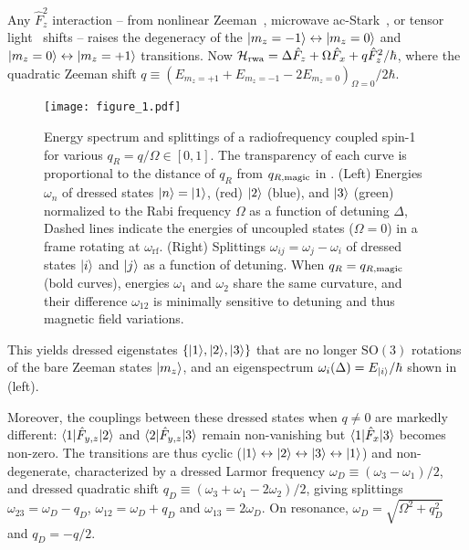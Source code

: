 \documentclass[aps,prl,reprint,superscriptaddress,floatfix]{revtex4-1}
\begin{document}
Any $\hat{F}_z^2$ interaction -- from nonlinear Zeeman~\cite{ramsey_molecular_1956}, microwave ac-Stark~\cite{gerbier_resonant_2006}, or tensor light~\cite{smith_continuous_2004} shifts -- raises the degeneracy of the $\vert m_z=-1 \rangle  \leftrightarrow \vert m_z=0 \rangle $ and $\vert m_z=0 \rangle  \leftrightarrow \vert m_z=+1 \rangle $ transitions. 
Now $\mathcal{H}_{\text{rwa}} = \Delta \hat{F}_z + \Omega \hat{F}_x + q \hat{F}_z^2/\hbar$, where the quadratic Zeeman shift $q \equiv (E_{m_z=+1} + E_{m_z=-1} - 2 E_{m_z=0})_{\Omega=0}/2\hbar$.
\begin{figure}
    \texttt{[image: figure\_1.pdf]}
    \caption{
    \label{fig:eigensystem_schematic}
        Energy spectrum and splittings of a radiofrequency coupled spin-1 for various $q_R = q/\Omega \in [0,1]$.
        The transparency of each curve is proportional to the distance of $q_R$ from $q_{R,\text{magic}}$ in .
        (Left) Energies $\omega_n$ of dressed states $\vert n \rangle =\vert 1 \rangle $, (red) $\vert 2 \rangle $ (blue), and $\vert 3 \rangle $ (green) normalized to the Rabi frequency $\Omega$ as a function of detuning $\Delta$,
        Dashed lines indicate the energies of uncoupled states ($\Omega=0$) in a frame rotating at $\omega_{\text{rf}}$.
        (Right) Splittings $\omega_{ij} = \omega_j - \omega_i$ of dressed states $\vert i \rangle $ and $\vert j \rangle $ as a function of detuning.
        When $q_R=q_{R,\text{magic}}$ (bold curves), energies $\omega_1$ and $\omega_2$ share the same curvature, and their difference $\omega_{12}$ is minimally sensitive to detuning and thus magnetic field variations.
    }
\end{figure}
This yields dressed eigenstates $\{\vert 1 \rangle , \vert 2 \rangle , \vert 3 \rangle \}$ that are no longer $\text{SO}(3)$ rotations of the bare Zeeman states $\vert m_z \rangle $, and an eigenspectrum $\omega_i(\Delta) = E_{\vert i \rangle }/\hbar$ shown in  (left).

Moreover, the couplings between these dressed states when $q \neq 0$ are markedly different:
$\langle 1 \vert  \hat{F}_{y,z} \vert 2 \rangle $ and $\langle 2 \vert  \hat{F}_{y,z} \vert 3 \rangle $ remain non-vanishing but $\langle 1 \vert  \hat{F}_x \vert 3 \rangle $ becomes non-zero.
The transitions are thus cyclic ($\vert 1 \rangle  \leftrightarrow \vert 2 \rangle  \leftrightarrow \vert 3 \rangle  \leftrightarrow \vert 1 \rangle $) and non-degenerate, characterized by a dressed Larmor frequency $\omega_D\equiv(\omega_3-\omega_1)/2$, and dressed quadratic shift $q_D \equiv (\omega_3 + \omega_1 -2\omega_2)/2$, giving splittings $\omega_{23}=\omega_D-q_D$, $\omega_{12}=\omega_D+q_D$ and $\omega_{13}=2\omega_D$.
On resonance, $\omega_D=\sqrt{\Omega^2+q_D^2}$ and $q_D = -q/2$.
\end{document}
